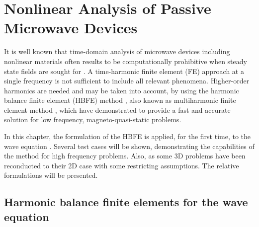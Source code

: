 \graphicspath{{img/ch3/}}
\chapter[Nonlinear analysis]{Nonlinear Analysis of Passive Microwave Devices} \label{chap:NL}

It is well known that time-domain analysis of microwave devices including nonlinear materials often results to be computationally prohibitive when steady state fields are sought for \cite{deGersem2001}. A time-harmonic finite element (FE) approach at a single frequency is not sufficient to include all relevant phenomena. Higher-order harmonics are needed and may be taken into account, by using the harmonic balance finite element (HBFE) method \cite{yamada1988harmonic, yamada1989harmonic, yamada1991calculation}, also known as multiharmonic finite element method \cite{copeland2010domain, kolmbauer2012frequency}, which have demonstrated to provide a fast and accurate solution for low frequency, magneto-quasi-static problems.

In this chapter, the formulation of the HBFE is applied, for the first time, to the wave equation \cite{ntibarikure2012efficient, ntibarikure2014harmonic}. Several test cases will be shown, demonstrating the capabilities of the method for high frequency problems. Also, as some 3D problems have been reconducted to their 2D case with some restricting assumptions. The relative formulations will be presented.



\section{Harmonic balance finite elements for the wave equation}
\label{sec:formulation}


